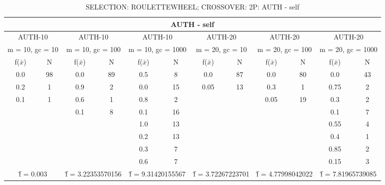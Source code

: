 \begin{table}[H]
	\centering
	\caption{SELECTION: ROULETTEWHEEL; CROSSOVER: 2P: AUTH - self}
	\begin{adjustbox}{width=1\textwidth}
		\begin{tabular}{ |c|c||c|c||c|c||c|c||c|c||c|c| }
			\hline
			\multicolumn{12}{|c|}{AUTH - self} \\
			\hline
			\multicolumn{2}{|c||}{AUTH-10} & \multicolumn{2}{c||}{AUTH-10} & \multicolumn{2}{c||}{AUTH-10} & \multicolumn{2}{c||}{AUTH-20} & \multicolumn{2}{c||}{AUTH-20} & \multicolumn{2}{c|}{AUTH-20}\\
			\hline
			\multicolumn{2}{|c||}{m = 10, gc = 10} & \multicolumn{2}{c||}{m = 10, gc = 100} & \multicolumn{2}{c||}{m = 10, gc = 1000} & \multicolumn{2}{c||}{m = 20, gc = 10} & \multicolumn{2}{c||}{m = 20, gc = 100} & \multicolumn{2}{c|}{m = 20, gc = 1000}\\
			\hline
			f($\bar{x}$) & N & f($\bar{x}$) & N & f($\bar{x}$) & N & f($\bar{x}$) & N & f($\bar{x}$) & N & f($\bar{x}$) & N\\
			\hline
			\hline
			0.0 & 98 & 0.0 & 89 & 0.5 & 8 & 0.0 & 87 & 0.0 & 80 & 0.0 & 43\\
			0.2 & 1 & 0.9 & 2 & 0.0 & 15 & 0.05 & 13 & 0.3 & 1 & 0.75 & 2\\
			0.1 & 1 & 0.6 & 1 & 0.8 & 2 &   &   & 0.05 & 19 & 0.3 & 2\\
			&   & 0.1 & 8 & 0.1 & 16 &   &   &   &   & 0.1 & 7\\
			&   &   &   & 1.0 & 13 &   &   &   &   & 0.55 & 4\\
			&   &   &   & 0.2 & 13 &   &   &   &   & 0.4 & 1\\
			&   &   &   & 0.3 & 7 &   &   &   &   & 0.85 & 2\\
			&   &   &   & 0.6 & 7 &   &   &   &   & 0.15 & 3\\
			\hline
			\multicolumn{2}{|c||}{\^{f} = 0.003} & \multicolumn{2}{c||}{\^{f} = 3.22353570156} & \multicolumn{2}{c||}{\^{f} = 9.31420155567} & \multicolumn{2}{c||}{\^{f} = 3.72267223701} & \multicolumn{2}{c||}{\^{f} = 4.77998042022} & \multicolumn{2}{c|}{\^{f} = 7.81965739085}\\
			\hline
		\end{tabular}
	\end{adjustbox}
\end{table}
